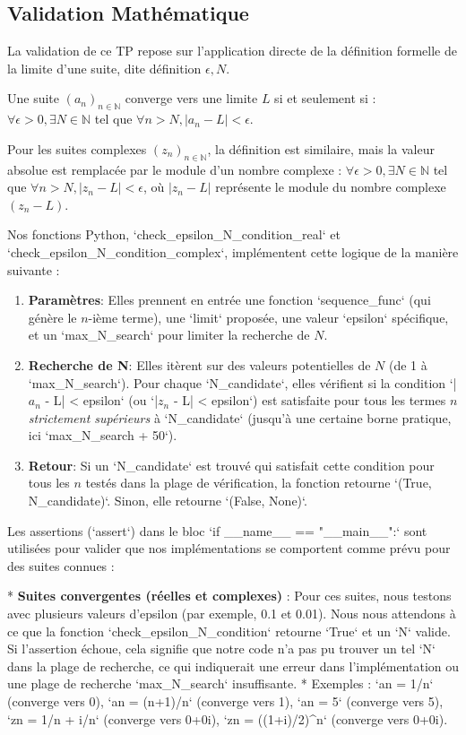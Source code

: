 \documentclass[a4paper,11pt]{report}
\begin{document}
\subsection*{Validation Mathématique}
La validation de ce TP repose sur l'application directe de la définition formelle de la limite d'une suite, dite définition $\epsilon, N$.

Une suite $(a_n)_{n \in \mathbb{N}}$ converge vers une limite $L$ si et seulement si :
$\forall \epsilon > 0, \exists N \in \mathbb{N}$ tel que $\forall n > N, |a_n - L| < \epsilon$.

Pour les suites complexes $(z_n)_{n \in \mathbb{N}}$, la définition est similaire, mais la valeur absolue est remplacée par le module d'un nombre complexe :
$\forall \epsilon > 0, \exists N \in \mathbb{N}$ tel que $\forall n > N, |z_n - L| < \epsilon$, où $|z_n - L|$ représente le module du nombre complexe $(z_n - L)$.

Nos fonctions Python, `check\_epsilon\_N\_condition\_real` et `check\_epsilon\_N\_condition\_complex`, implémentent cette logique de la manière suivante :
\begin{enumerate}
\item \textbf{Paramètres}: Elles prennent en entrée une fonction `sequence\_func` (qui génère le $n$-ième terme), une `limit` proposée, une valeur `epsilon` spécifique, et un `max\_N\_search` pour limiter la recherche de $N$.

\item \textbf{Recherche de N}: Elles itèrent sur des valeurs potentielles de $N$ (de 1 à `max\_N\_search`). Pour chaque `N\_candidate`, elles vérifient si la condition `|$a_n$ - L| < epsilon` (ou `|$z_n$ - L| < epsilon`) est satisfaite pour tous les termes $n$ \textit{strictement supérieurs} à `N\_candidate` (jusqu'à une certaine borne pratique, ici `max\_N\_search + 50`).

\item \textbf{Retour}: Si un `N\_candidate` est trouvé qui satisfait cette condition pour tous les $n$ testés dans la plage de vérification, la fonction retourne `(True, N\_candidate)`. Sinon, elle retourne `(False, None)`.
\end{enumerate}

Les assertions (`assert`) dans le bloc `if \_\_name\_\_ == "\_\_main\_\_":` sont utilisées pour valider que nos implémentations se comportent comme prévu pour des suites connues :

*   \textbf{Suites convergentes (réelles et complexes)} : Pour ces suites, nous testons avec plusieurs valeurs d'epsilon (par exemple, 0.1 et 0.01). Nous nous attendons à ce que la fonction `check\_epsilon\_N\_condition` retourne `True` et un `N` valide. Si l'assertion échoue, cela signifie que notre code n'a pas pu trouver un tel `N` dans la plage de recherche, ce qui indiquerait une erreur dans l'implémentation ou une plage de recherche `max\_N\_search` insuffisante.
    *   Exemples : `an = 1/n` (converge vers 0), `an = (n+1)/n` (converge vers 1), `an = 5` (converge vers 5), `zn = 1/n + i/n` (converge vers 0+0i), `zn = ((1+i)/2)^n` (converge vers 0+0i).
\end{document}
